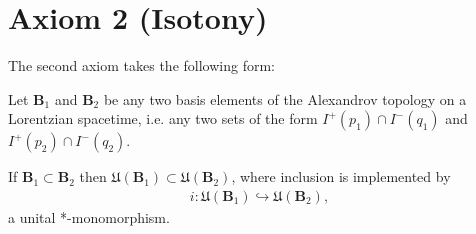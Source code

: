 \section{Axiom 2 (Isotony)}\label{sctn:axiom-2-(isotony)}
The second axiom takes the following form:

\begin{axiom}[Isotony]
    Let $\mathbf{B}_1$ and $\mathbf{B}_2$ be any two basis elements of the Alexandrov topology on a Lorentzian spacetime, i.e. any two sets of the form $I^+(p_1) \cap I^-(q_1)$ and $I^+(p_2) \cap I^-(q_2)$.
    
    If $\mathbf{B}_1 \subset \mathbf{B}_2$ then $\mathfrak{U}(\mathbf{B}_1) \subset \mathfrak{U}(\mathbf{B}_2)$, where inclusion is implemented by
    \begin{align}
        i : \mathfrak{U}(\mathbf{B}_1) \hookrightarrow \mathfrak{U}(\mathbf{B}_2),
    \end{align}
    a unital *-monomorphism.
\end{axiom}
